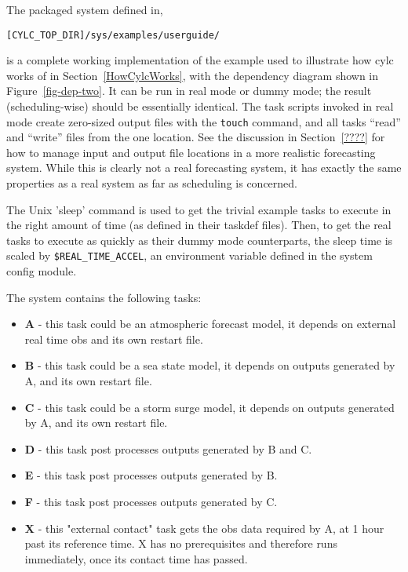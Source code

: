 

The packaged system defined in,

\begin{lstlisting}
[CYLC_TOP_DIR]/sys/examples/userguide/
\end{lstlisting}

is a complete working implementation of the example used to illustrate
how cylc works of in Section~\ref{HowCylcWorks}, with the dependency
diagram shown in Figure~\ref{fig-dep-two}. It can be run in real mode or
dummy mode; the result (scheduling-wise) should be essentially
identical. The task scripts invoked in real mode create zero-sized
output files with the \lstinline=touch= command, and all tasks ``read''
and ``write'' files from the one location. See the discussion in
Section~\ref{????} for how to manage input and output file locations in
a more realistic forecasting system. While this is clearly not a real
forecasting system, it has exactly the same properties as a real system
as far as scheduling is concerned.  

The Unix 'sleep' command is used to get the trivial example tasks to
execute in the right amount of time (as defined in their taskdef files).
Then, to get the real tasks to execute as quickly as their dummy mode
counterparts, the sleep time is scaled by \lstinline=$REAL_TIME_ACCEL=,
an environment variable defined in the system config module.

The system contains the following tasks:

\begin{itemize}
    \item {\bf A} - this task could be an atmospheric forecast model,
    it depends on external real time obs and its own restart file.
    \item {\bf B} - this task could be a sea state model, it depends on 
    outputs generated by A, and its own restart file.
    \item {\bf C} - this task could be a storm surge model, it depends on 
    outputs generated by A, and its own restart file.
    \item {\bf D} - this task post processes outputs generated by B and C.
    \item {\bf E} - this task post processes outputs generated by B.
    \item {\bf F} - this task post processes outputs generated by C.
    \item {\bf X} - this "external contact" task gets the obs data required
    by A, at 1 hour past its reference time. X has no prerequisites and
    therefore runs immediately, once its contact time has passed.
\end{itemize}

